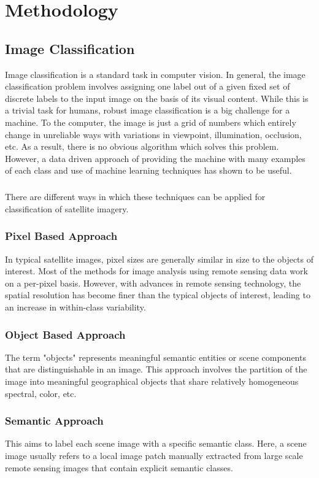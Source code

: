 \documentclass[12pt, a4paper]{report}
\begin{document}

\chapter{Methodology}
\section{Image Classification}

Image classification is a standard task in computer vision. In general, the image classification problem involves assigning one  label out of a given fixed set of discrete labels to the input image on the basis of its visual content. While this is a trivial task for humans, robust image classification is a big challenge for a machine. To the computer, the image is just a grid of numbers which entirely change in unreliable ways with variations in viewpoint, illumination, occlusion, etc. As a result, there is no obvious algorithm which solves this problem. However, a data driven approach of providing the machine with many examples of each class and use of machine learning techniques has shown to be useful.\cite{cs231n}
\paragraph{}
There are different ways in which these techniques can be applied for classification of satellite imagery.
\subsection{Pixel Based Approach}
In typical satellite images, pixel sizes are generally similar in size to the objects of interest. Most of the methods for image analysis using remote sensing data work on a per-pixel basis. However, with advances in remote sensing technology, the spatial resolution has become finer than the typical objects of interest, leading to an increase in within-class variability.\cite{eyesky}
\subsection{Object Based Approach}
The term "objects" represents meaningful semantic entities or scene components that are distinguishable in an image.\cite{eyesky} This approach involves the partition of the image into meaningful geographical objects that share relatively homogeneous spectral, color, etc.
\subsection{Semantic Approach}
This aims to label each scene image with a specific semantic class. Here, a scene image usually refers to a local image patch manually extracted from large scale remote sensing images that contain explicit semantic classes.\cite{eyesky}
\end{document}

